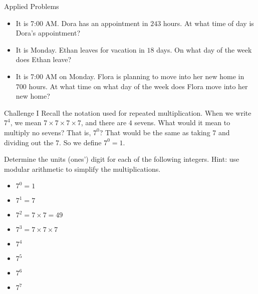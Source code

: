 \documentclass[12pt,letterpaper]{article}
\begin{document}
\begin{problem}{Applied Problems}

 \begin{itemize}
  \item It is 7:00 AM. Dora has an appointment in \(243\) hours. At what time of
  day is Dora's appointment? 
  \item It is Monday. Ethan leaves for vacation in \(18\) days. On what day of the
  week does Ethan leave? 
  \item It is 7:00 AM on Monday. Flora is planning to move into her new home in
  \(700\) hours. At what time on what day of the week does Flora move into her new
  home? 
 \end{itemize}
\end{problem}

\begin{problem}{Challenge I}
 Recall the notation used for repeated multiplication. When we write \(7^4\), we
 mean \(7 \times 7 \times 7 \times 7\), and there are \(4\) sevens. What would it
 mean to multiply no sevens? That is, \(7^0\)? That would be the same as taking
 \(7\) and dividing out the \(7\). So we define \(7^0=1\).

 Determine the units (ones') digit for each of the following integers. Hint:
 use modular arithmetic to simplify the multiplications.

 \begin{itemize}
  \item \(7^0 = 1\) \hfill {}
  \item \(7^1 = 7\) \hfill {}
  \item \(7^2 = 7 \times 7 = 49\) \hfill {}
  \item \(7^3 = 7 \times 7 \times 7\) \hfill {}
  \item \(7^4\) \hfill {}
  \item \(7^5\) \hfill {}
  \item \(7^6\) \hfill {}
  \item \(7^7\) \hfill {}
 \end{itemize}
\end{problem}
\end{document}
